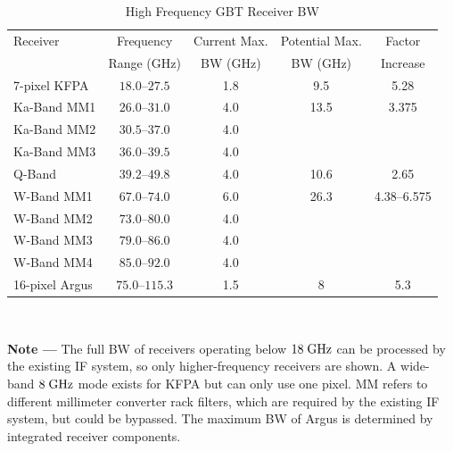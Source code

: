 \documentclass[10pt]{myNSF}
\begin{document}
\begin{table}[t]
  \begin{center}
  \caption{High Frequency GBT Receiver BW \label{table:rx_bandwidth}}
  \begin{tabular}{|l|c|c|c|c|}
    \hline
    Receiver & Frequency & Current Max. &  Potential Max. &  Factor  \\ &  Range (GHz) & BW (GHz) & BW (GHz) & Increase \\
    \hline
    7-pixel KFPA   & $18.0$--$27.5$ & 1.8 & 9.5 & 5.28 \\
    \hline
    Ka-Band MM1    & $26.0$--$31.0$ & 4.0 & 13.5 & 3.375 \\
    Ka-Band MM2    & $30.5$--$37.0$ & 4.0 & & \\
    Ka-Band MM3    & $36.0$--$39.5$ & 4.0 & & \\
    \hline
    Q-Band         & $39.2$--$49.8$ & 4.0 & 10.6 & 2.65 \\
    \hline
    W-Band MM1     & $67.0$--$74.0$ & 6.0 & 26.3 & 4.38--6.575 \\
    W-Band MM2     & $73.0$--$80.0$ & 4.0 & & \\
    W-Band MM3     & $79.0$--$86.0$ & 4.0 & & \\
    W-Band MM4     & $85.0$--$92.0$ & 4.0 & & \\
    \hline
    16-pixel Argus & $75.0$--$115.3$ & 1.5 & 8 & 5.3 \\
    \hline
  \end{tabular} \\
  \end{center}
  \textbf{Note ---} The full BW of receivers operating below $18\;
  \textrm{GHz}$ can be processed by the existing IF system, so only
  higher-frequency receivers are shown.  A wide-band $8\; \textrm{GHz}$ mode
  exists for KFPA but can only use one pixel.  MM refers to different
  millimeter converter rack filters, which are required by the
  existing IF system, but could be bypassed.  The maximum BW of Argus
  is determined by integrated receiver components.
\end{table}
\end{document}
